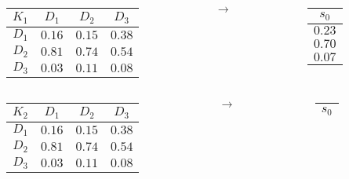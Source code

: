 \documentclass{beamer}
\begin{document}
\begin{frame}
	\begin{columns}
		\begin{column}{0.4\textwidth}
			\begin{table}
				\begin{tabular}{c|c|c|c}
				$K_1$	&	$D_1$	&	$D_2$	&	$D_3$\\ \hline
				$D_1$	&	$0.16$	&	$0.15$	&	$0.38$\\ \hline
				$D_2$	&	$0.81$	&	$0.74$	&	$0.54$\\ \hline
				$D_3$	&	$0.03$	&	$0.11$	&	$0.08$
				\end{tabular}
			\end{table}
		\end{column}
		\begin{column}{0.1\textwidth}
			$\rightarrow$
		\end{column}
		\begin{column}{0.1\textwidth}
			\begin{table}
				\begin{tabular}{c}
				$s_0$\\ \hline
				$0.23$\\
				$0.70$\\
				$0.07$
				\end{tabular}
			\end{table}
		\end{column}
	\end{columns}
	\begin{columns}
		\begin{column}{0.4\textwidth}
			\begin{table}
				\begin{tabular}{c|c|c|c}
				$K_2$	&	$D_1$	&	$D_2$	&	$D_3$\\ \hline
				$D_1$	&	$0.16$	&	$0.15$	&	$0.38$\\ \hline
				$D_2$	&	$0.81$	&	$0.74$	&	$0.54$\\ \hline
				$D_3$	&	$0.03$	&	$0.11$	&	$0.08$
				\end{tabular}
			\end{table}
		\end{column}
		\begin{column}{0.1\textwidth}
			$\rightarrow$
		\end{column}
		\begin{column}{0.1\textwidth}
			\begin{table}
				\begin{tabular}{c}
				$s_0$\\ \hline

\end{tabular}
\end{table}
\end{column}
\end{columns}
\end{frame}
\end{document}

